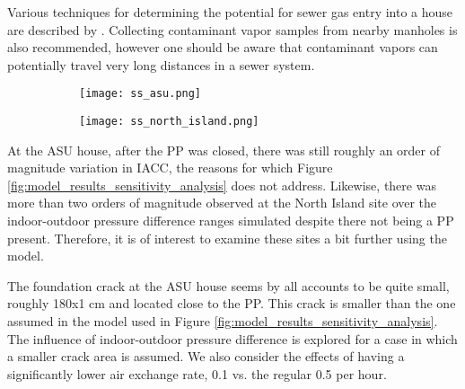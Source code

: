 \documentclass[journal=esthag,manuscript=article]{achemso}
\begin{document}
Various techniques for determining the potential for sewer gas entry into a house are described by \citeauthor{nielsen_remediation_2017-1}\cite{nielsen_remediation_2017-1}.
Collecting contaminant vapor samples from nearby manholes is also recommended, however one should be aware that contaminant vapors can potentially travel very long distances in a sewer system\cite{mchugh_evidence_2017,roghani_occurrence_2018,riis_vapor_2010}.

\begin{figure}[htb!]
  \caption{Attenuation factor vs. indoor-outdoor pressure difference when considering VI scenarios similar to the ASU house and the North Island NAS site (\ref{fig:ss_asu} and \ref{fig:ss_north_island} respectively).}
  \label{fig:model_results_asu_north_island}
  \begin{subfigure}[t]{0.45\textwidth}
    \caption{ }
    \label{fig:ss_asu}
    \texttt{[image: ss\_asu.png]}
  \end{subfigure}
  \begin{subfigure}[t]{0.45\textwidth}
    \caption{ }
    \label{fig:ss_north_island}
    \texttt{[image: ss\_north\_island.png]}
  \end{subfigure}
\end{figure}

At the ASU house, after the PP was closed, there was still roughly an order of magnitude variation in IACC, the reasons for which Figure \ref{fig:model_results_sensitivity_analysis} does not address.
Likewise, there was more than two orders of magnitude observed at the North Island site over the indoor-outdoor pressure difference ranges simulated despite there not being a PP present.
Therefore, it is of interest to examine these sites a bit further using the model.

The foundation crack at the ASU house seems by all accounts to be quite small, roughly 180x1 cm and located close to the PP\cite{guo_vapor_2015}.
This crack is smaller than the one assumed in the model used in Figure \ref{fig:model_results_sensitivity_analysis}.
The influence of indoor-outdoor pressure difference is explored for a case in which a smaller crack area is assumed.
We also consider the effects of having a significantly lower air exchange rate, 0.1 vs. the regular 0.5 per hour.
\end{document}
